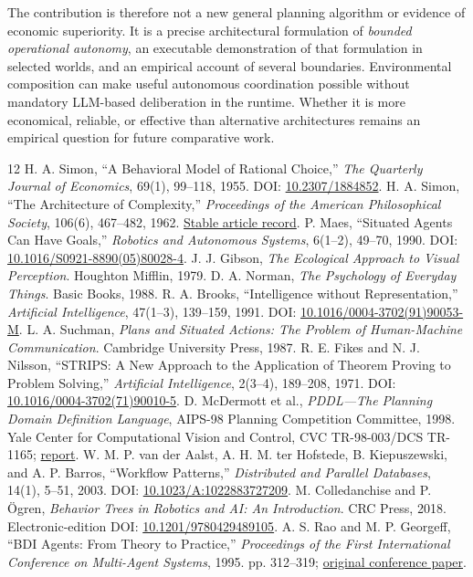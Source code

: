 \documentclass[11pt]{article}
\begin{document}
The contribution is therefore not a new general planning algorithm or evidence of economic superiority. It is a precise architectural formulation of \emph{bounded operational autonomy}, an executable demonstration of that formulation in selected worlds, and an empirical account of several boundaries. Environmental composition can make useful autonomous coordination possible without mandatory LLM-based deliberation in the runtime. Whether it is more economical, reliable, or effective than alternative architectures remains an empirical question for future comparative work.
\begin{thebibliography}{12}
 H. A. Simon, ``A Behavioral Model of Rational Choice,'' \emph{The Quarterly Journal of Economics}, 69(1), 99--118, 1955. \newblock DOI: \href{https://doi.org/10.2307/1884852}{10.2307/1884852}.
 H. A. Simon, ``The Architecture of Complexity,'' \emph{Proceedings of the American Philosophical Society}, 106(6), 467--482, 1962. \newblock \href{https://www.jstor.org/stable/985254}{Stable article record}.
 P. Maes, ``Situated Agents Can Have Goals,'' \emph{Robotics and Autonomous Systems}, 6(1--2), 49--70, 1990. \newblock DOI: \href{https://doi.org/10.1016/S0921-8890(05)80028-4}{10.1016/S0921-8890(05)80028-4}.
 J. J. Gibson, \emph{The Ecological Approach to Visual Perception}. Houghton Mifflin, 1979.
 D. A. Norman, \emph{The Psychology of Everyday Things}. Basic Books, 1988.
 R. A. Brooks, ``Intelligence without Representation,'' \emph{Artificial Intelligence}, 47(1--3), 139--159, 1991. \newblock DOI: \href{https://doi.org/10.1016/0004-3702(91)90053-M}{10.1016/0004-3702(91)90053-M}.
 L. A. Suchman, \emph{Plans and Situated Actions: The Problem of Human-Machine Communication}. Cambridge University Press, 1987.
 R. E. Fikes and N. J. Nilsson, ``STRIPS: A New Approach to the Application of Theorem Proving to Problem Solving,'' \emph{Artificial Intelligence}, 2(3--4), 189--208, 1971. \newblock DOI: \href{https://doi.org/10.1016/0004-3702(71)90010-5}{10.1016/0004-3702(71)90010-5}.
 D. McDermott et al., \emph{PDDL---The Planning Domain Definition Language}, AIPS-98 Planning Competition Committee, 1998. \newblock Yale Center for Computational Vision and Control, CVC TR-98-003/DCS TR-1165; \href{https://www.cs.cmu.edu/~mmv/planning/readings/98aips-PDDL.pdf}{report}.
 W. M. P. van der Aalst, A. H. M. ter Hofstede, B. Kiepuszewski, and A. P. Barros, ``Workflow Patterns,'' \emph{Distributed and Parallel Databases}, 14(1), 5--51, 2003. \newblock DOI: \href{https://doi.org/10.1023/A:1022883727209}{10.1023/A:1022883727209}.
 M. Colledanchise and P. \"Ogren, \emph{Behavior Trees in Robotics and AI: An Introduction}. CRC Press, 2018. \newblock Electronic-edition DOI: \href{https://doi.org/10.1201/9780429489105}{10.1201/9780429489105}.
 A. S. Rao and M. P. Georgeff, ``BDI Agents: From Theory to Practice,'' \emph{Proceedings of the First International Conference on Multi-Agent Systems}, 1995. \newblock pp. 312--319; \href{https://cdn.aaai.org/ICMAS/1995/ICMAS95-042.pdf}{original conference paper}.
\end{thebibliography}
\end{document}
